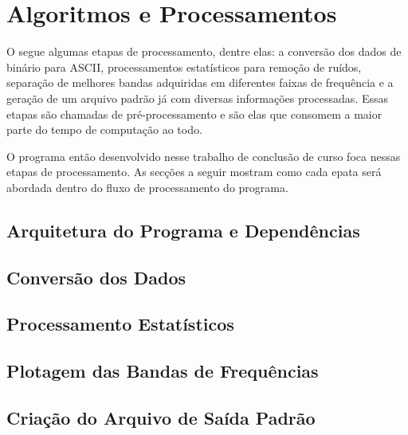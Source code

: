 \chapter{Algoritmos e Processamentos}
\label{cap-algoritmos}
    
    O \MT segue algumas etapas de processamento, dentre elas: a conversão dos dados de binário para ASCII, processamentos estatísticos para remoção de ruídos, separação de melhores bandas adquiridas em diferentes faixas de frequência e a geração de um arquivo padrão já com diversas informações processadas. Essas etapas são chamadas de pré-processamento e são elas que consomem a maior parte do tempo de computação ao todo.
    
    O programa então desenvolvido nesse trabalho de conclusão de curso foca nessas etapas de processamento. As secções a seguir mostram como cada epata será abordada dentro do fluxo de processamento do programa.
    
    \section{Arquitetura do Programa e Dependências}
    \section{Conversão dos Dados}
    \section{Processamento Estatísticos}
    \section{Plotagem das Bandas de Frequências}
    \section{Criação do Arquivo de Saída Padrão}
    
    
    
